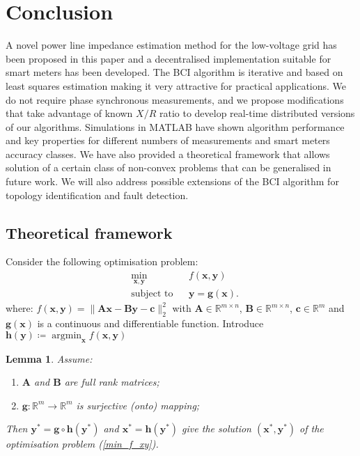 \documentclass[journal,10pt,onecolumn,draftclsnofoot,]{IEEEtran}
\theoremstyle{plain}
\newtheorem{lemma}{Lemma}
\theoremstyle{definition}
\theoremstyle{remark}
\DeclareMathOperator{\argmin}{argmin}
\DeclareMathOperator{\st}{subject ~ to}
\begin{document}
\section{Conclusion}
A novel power line impedance estimation method for the low-voltage grid has been proposed in this paper and a decentralised implementation suitable for smart meters has been developed. The BCI algorithm is iterative and based on least squares estimation making it very attractive for practical applications. We do not require phase synchronous measurements, and we propose modifications that take advantage of known $X/R$ ratio to develop real-time distributed versions of our algorithms. Simulations in MATLAB have shown algorithm performance and key properties for different numbers of measurements and smart meters accuracy classes. 
We have also provided a theoretical framework that allows solution of a certain class of non-convex problems that can be generalised in future work. We will also address possible extensions of the BCI algorithm for topology identification and fault detection.

\appendix
\label{appendix}

\subsection{Theoretical framework}

Consider the following optimisation problem:
\begin{equation}
\begin{aligned}
& \min_{\bm{x}, \bm{y}} 
& & f(\bm{x}, \bm{y}) \\
& \st
& & \bm{y} = \bm{g}(\bm{x}).
\end{aligned}
\label{min_f_xy}
\end{equation}
where:
$f(\bm{x}, \bm{y}) = \|\bm{A}\bm{x} - \bm{B}\bm{y} - \bm{c} \|_2^2$ with $\bm{A} \in \mathbb{R}^{m\times n}$, $\bm{B} \in \mathbb{R}^{m\times n}$, $\bm{c} \in \mathbb{R}^{m}$ and $\bm{g}(\bm{x})$ is a continuous and differentiable function. Introduce $\bm{h}(\bm{y}) \coloneqq \argmin_{\bm{x}} f(\bm{x}, \bm{y})$

\begin{lemma}
\label{lemma1}
Assume:
\begin{enumerate}[(1)]
\item $\bm{A}$ and $\bm{B}$ are full rank matrices;
\item $\bm{g} \colon \mathbb{R}^m \rightarrow \mathbb{R}^m$ is surjective (onto) mapping; 
\end{enumerate}
Then $\bm{y}^* = \bm{g} \circ \bm{h}(\bm{y}^*)$ and $\bm{x}^* = \bm{h}(\bm{y}^*)$ give the solution $(\bm{x}^*, \bm{y}^*)$ of the optimisation problem (\ref{min_f_xy}).
\end{lemma}
\end{document}
